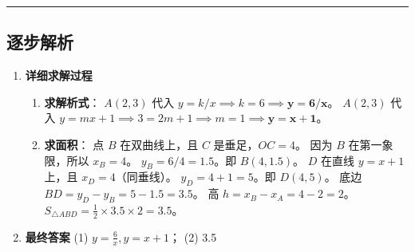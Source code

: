 \documentclass[UTF8]{ctexart}
\newenvironment{redenv}{\color{red}}{}
\newenvironment{detailedanalysis}{%
    \color{red}
    \begin{enumerate}[label=\textbf{第\arabic*步：}, leftmargin=*, align=left, itemsep=1.5ex]
}{%
    \end{enumerate}
}
\newcommand{\analysisrule}{\noindent\rule{\textwidth}{0.8pt}\vspace{-0.8em}}
\begin{document}
\begin{redenv}
\analysisrule
\subsection*{逐步解析}

\begin{detailedanalysis}
\item \textbf{详细求解过程}
\begin{enumerate}[label=(\arabic*)]
    \item \textbf{求解析式}：
    $A(2,3)$ 代入 $y=k/x \implies k=6 \implies \boldsymbol{y=6/x}$。
    $A(2,3)$ 代入 $y=mx+1 \implies 3=2m+1 \implies m=1 \implies \boldsymbol{y=x+1}$。
    
    \item \textbf{求面积}：
    点 $B$ 在双曲线上，且 $C$ 是垂足，$OC=4$。
    因为 $B$ 在第一象限，所以 $x_B=4$。
    $y_B = 6/4 = 1.5$。即 $B(4, 1.5)$。
    $D$ 在直线 $y=x+1$ 上，且 $x_D=4$（同垂线）。
    $y_D = 4+1 = 5$。即 $D(4, 5)$。
    底边 $BD = y_D - y_B = 5 - 1.5 = 3.5$。
    高 $h = x_B - x_A = 4 - 2 = 2$。
    $S_{\triangle ABD} = \frac{1}{2} \times 3.5 \times 2 = 3.5$。
\end{enumerate}

\item \textbf{最终答案}
(1) $y=\frac{6}{x}, y=x+1$； (2) 3.5
\end{detailedanalysis}
\end{redenv}
\end{document}
